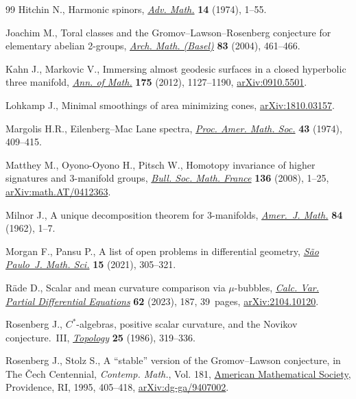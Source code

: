 \documentclass[10pt,a4paper]{amsart}
\numberwithin{equation}{section}
\begin{document}
\begin{thebibliography}{99}
Hitchin N., Harmonic spinors, \href{https://doi.org/10.1016/0001-8708(74)90021-8}{\textit{Adv. Math.}} \textbf{14} (1974), 1--55.

Joachim M., Toral classes and the {G}romov--{L}awson--{R}osenberg conjecture
 for elementary abelian 2-groups, \href{https://doi.org/10.1007/s00013-004-1080-5}{\textit{Arch. Math. (Basel)}} \textbf{83}
 (2004), 461--466.

Kahn J., Markovic V., Immersing almost geodesic surfaces in a closed hyperbolic
 three manifold, \href{https://doi.org/10.4007/annals.2012.175.3.4}{\textit{Ann. of Math.}} \textbf{175} (2012), 1127--1190,
 \href{https://arxiv.org/abs/0910.5501}{arXiv:0910.5501}.

Lohkamp J., Minimal smoothings of area minimizing cones, \href{https://arxiv.org/abs/1810.03157}{arXiv:1810.03157}.

Margolis H.R., Eilenberg--{M}ac {L}ane spectra, \href{https://doi.org/10.2307/2038905}{\textit{Proc. Amer. Math. Soc.}}
 \textbf{43} (1974), 409--415.

Matthey M., Oyono-Oyono H., Pitsch W., Homotopy invariance of higher signatures
 and 3-manifold groups, \href{https://doi.org/10.24033/bsmf.2547}{\textit{Bull. Soc. Math. France}} \textbf{136} (2008),
 1--25, \href{https://arxiv.org/abs/math.AT/0412363}{arXiv:math.AT/0412363}.

Milnor J., A unique decomposition theorem for 3-manifolds, \href{https://doi.org/10.2307/2372800}{\textit{Amer.~J.
 Math.}} \textbf{84} (1962), 1--7.

Morgan F., Pansu P., A list of open problems in differential geometry,
 \href{https://doi.org/10.1007/s40863-019-00141-8}{\textit{S\~ao Paulo~J. Math. Sci.}} \textbf{15} (2021), 305--321.

R\"ade D., Scalar and mean curvature comparison via {$\mu $}-bubbles,
 \href{https://doi.org/10.1007/s00526-023-02520-8}{\textit{Calc. Var. Partial Differential Equations}} \textbf{62} (2023), 187,
 39~pages, \href{https://arxiv.org/abs/2104.10120}{arXiv:2104.10120}.

Rosenberg J., {$C^\ast$}-algebras, positive scalar curvature, and the {N}ovikov
 conjecture.~{III}, \href{https://doi.org/10.1016/0040-9383(86)90047-9}{\textit{Topology}} \textbf{25} (1986), 319--336.

Rosenberg J., Stolz S., A ``stable'' version of the {G}romov--{L}awson
 conjecture, in The {\v{C}}ech {C}entennial, \textit{Contemp. Math.}, Vol.
 181, \href{https://doi.org/10.1090/conm/181/02046}{American Mathematical Society}, Providence, RI, 1995, 405--418,
 \href{https://arxiv.org/abs/dg-ga/9407002}{arXiv:dg-ga/9407002}.


\end{thebibliography}
\end{document}
